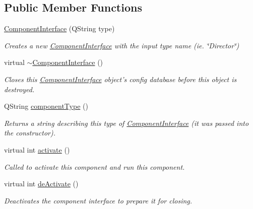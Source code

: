 \subsection*{Public Member Functions}
\begin{DoxyCompactItemize}
\item 
\hyperlink{class_component_interface_a06eb2098a6ca2ed4ce36d6ddc03627fd}{Component\-Interface} (Q\-String type)
\begin{DoxyCompactList}\small\item\em Creates a new \hyperlink{class_component_interface}{Component\-Interface} with the input type name (ie. \char`\"{}\-Director\char`\"{}) \end{DoxyCompactList}\item 
\hypertarget{class_component_interface_a9e0bf6312b07c414d29694740ca63817}{virtual \hyperlink{class_component_interface_a9e0bf6312b07c414d29694740ca63817}{$\sim$\-Component\-Interface} ()}\label{class_component_interface_a9e0bf6312b07c414d29694740ca63817}

\begin{DoxyCompactList}\small\item\em Closes this \hyperlink{class_component_interface}{Component\-Interface} object's config database before this object is destroyed. \end{DoxyCompactList}\item 
\hypertarget{class_component_interface_a3c9e4eb4ca4cbcda4bc6299c8931c893}{Q\-String \hyperlink{class_component_interface_a3c9e4eb4ca4cbcda4bc6299c8931c893}{component\-Type} ()}\label{class_component_interface_a3c9e4eb4ca4cbcda4bc6299c8931c893}

\begin{DoxyCompactList}\small\item\em Returns a string describing this type of \hyperlink{class_component_interface}{Component\-Interface} (it was passed into the constructor). \end{DoxyCompactList}\item 
virtual int \hyperlink{class_component_interface_aa5114fa432d4102e697b808c986a59bd}{activate} ()
\begin{DoxyCompactList}\small\item\em Called to activate this component and run this component. \end{DoxyCompactList}\item 
virtual int \hyperlink{class_component_interface_a5d5df5e3c0fddfdf2997467dfef8e94e}{de\-Activate} ()
\begin{DoxyCompactList}\small\item\em Deactivates the component interface to prepare it for closing. \end{DoxyCompactList}\end{DoxyCompactItemize}
